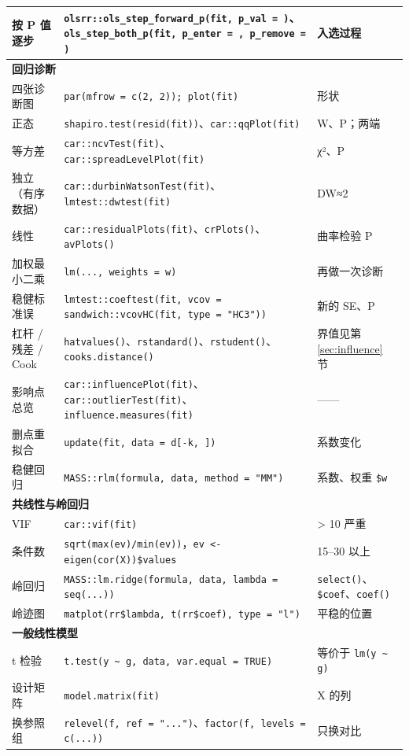 \begin{tabular}{p{3.3cm}p{6.6cm}p{4.6cm}}
按 P 值逐步 & \Verb|olsrr::ols_step_forward_p(fit, p_val = )|、\Verb|ols_step_both_p(fit, p_enter = , p_remove = )| & 入选过程\\
\midrule
\multicolumn{3}{l}{\textbf{回归诊断}}\\
四张诊断图 & \Verb|par(mfrow = c(2, 2)); plot(fit)| & 形状\\
正态 & \Verb|shapiro.test(resid(fit))|、\Verb|car::qqPlot(fit)| & W、P；两端\\
等方差 & \Verb|car::ncvTest(fit)|、\Verb|car::spreadLevelPlot(fit)| & χ²、P\\
独立（有序数据） & \Verb|car::durbinWatsonTest(fit)|、\Verb|lmtest::dwtest(fit)| & DW≈2\\
线性 & \Verb|car::residualPlots(fit)|、\Verb|crPlots()|、\Verb|avPlots()| & 曲率检验 P\\
加权最小二乘 & \Verb|lm(..., weights = w)| & 再做一次诊断\\
稳健标准误 & \Verb|lmtest::coeftest(fit, vcov = sandwich::vcovHC(fit, type = "HC3"))| & 新的 SE、P\\
杠杆 / 残差 / Cook & \Verb|hatvalues()|、\Verb|rstandard()|、\Verb|rstudent()|、\Verb|cooks.distance()| & 界值见第 \ref{sec:influence} 节\\
影响点总览 & \Verb|car::influencePlot(fit)|、\Verb|car::outlierTest(fit)|、\Verb|influence.measures(fit)| & ——\\
删点重拟合 & \Verb|update(fit, data = d[-k, ])| & 系数变化\\
稳健回归 & \Verb|MASS::rlm(formula, data, method = "MM")| & 系数、权重 \Verb|$w|\\
\midrule
\multicolumn{3}{l}{\textbf{共线性与岭回归}}\\
VIF & \Verb|car::vif(fit)| & > 10 严重\\
条件数 & \Verb|sqrt(max(ev)/min(ev))|，\Verb|ev <- eigen(cor(X))$values| & 15–30 以上\\
岭回归 & \Verb|MASS::lm.ridge(formula, data, lambda = seq(...))| & \Verb|select()|、\Verb|$coef|、\Verb|coef()|\\
岭迹图 & \Verb|matplot(rr$lambda, t(rr$coef), type = "l")| & 平稳的位置\\
\midrule
\multicolumn{3}{l}{\textbf{一般线性模型}}\\
t 检验 & \Verb|t.test(y ~ g, data, var.equal = TRUE)| & 等价于 \Verb|lm(y ~ g)|\\
设计矩阵 & \Verb|model.matrix(fit)| & X 的列\\
换参照组 & \Verb|relevel(f, ref = "...")|、\Verb|factor(f, levels = c(...))| & 只换对比\\

\end{tabular}
